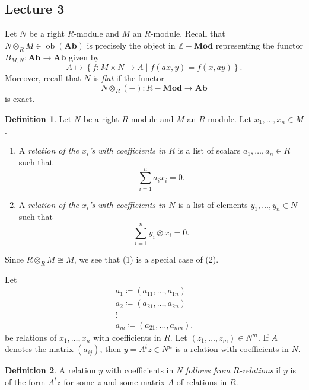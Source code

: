 \documentclass[10pt,letterpaper,cm]{nupset}
\theoremstyle{definition}
\newtheorem{definition}{Definition}[subsection]
\theoremstyle{theorem}
\theoremstyle{remark}
\newcommand{\Z}{\mathbb Z}
\newcommand{\1}{\mathbf{1}}
\newcommand{\0}{\vec 0}
\DeclareMathOperator{\ob}{ob}
\begin{document}
\subsection{Lecture 3}


Let $N$ be a right $R$-module and $M$ an $R$-module. Recall that $N \otimes_R M \in \ob(\mathbf{Ab})$ is precisely the object in $\Z{-}\mathbf{Mod}$ representing the functor $B_{M, N}: \mathbf{Ab} \to \mathbf{Ab}$ given by $$A \mapsto \left\{f:  M \times N \to A \mid f(ax, y) = f(x, ay) \right\}.$$ Moreover, recall that $N$ is \textit{flat} if the functor
\[
N \otimes_R (-) : R{-}\mathbf{Mod} \to \mathbf{Ab}
\] is exact.


\begin{definition} Let $N$ be a right $R$-module and $M$ an $R$-module. Let $x_1, \ldots, x_n \in M$.
\begin{enumerate}[label=(\arabic*)]
\item A \textit{relation of the $x_i$'s with coefficients in $R$} is a list of scalars $a_1, \ldots, a_n \in R$ such that $$\sum_{i=1}^n a_ix_i =0.$$
\item A \textit{relation of the $x_i$'s with coefficients in $N$} is a list of elements $y_1, \ldots, y_n \in N$ such that $$\sum_{i=1}^n y_i \otimes x_i =0.$$ 
\end{enumerate}
\end{definition}

Since $R \otimes_R M \cong M$, we see that (1) is a special case of (2).

\smallskip

Let
\begin{gather*}
 a_1 \coloneqq  (a_{11}, \ldots, a_{1n})
\\  a_2 \coloneqq  (a_{21}, \ldots, a_{2n})
\\  \vdots
\\  a_m \coloneqq  (a_{21}, \ldots, a_{mn}).
\end{gather*} be relations of $x_1, \ldots, x_n$ with coefficients in $R$.
Let $\left(z_1, \ldots, z_m\right)\in N^m$. If $A$ denotes the matrix $\left(a_{ij}\right)$, then $y= A^tz \in N^n$ is a relation with coefficients in $N$.


\begin{definition}
A relation $y$ with coefficients in $N$ \textit{follows from $R$-relations} if $y$ is of the form $A^tz$ for some $z$ and some matrix $A$  of relations in $R$.
\end{definition}
\end{document}
